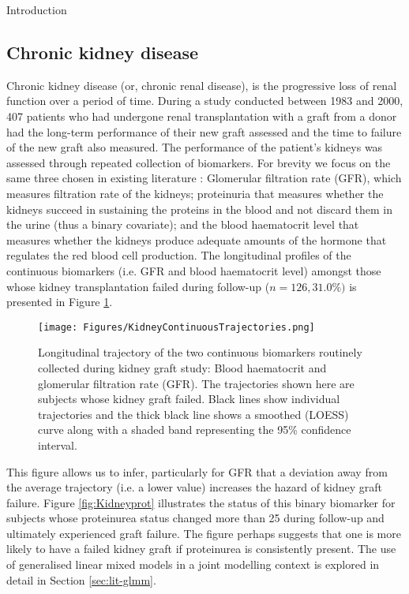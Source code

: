 \begin{chapter}{\label{cha:intro}Introduction}
  \subsection{\label{sec:motivation-kidney}Chronic kidney disease}
  Chronic kidney disease (or, chronic renal disease), is the progressive loss of renal function over a period of time. During a study conducted between 1983 and 2000, 407 patients who had undergone renal transplantation with a graft from a donor had the long-term performance of their new graft assessed and the time to failure of the new graft also measured. The performance of the patient's kidneys was assessed through repeated collection of biomarkers. For brevity we focus on the same three chosen in existing literature \citep{Rizopoulos2011B}: Glomerular filtration rate (GFR), which measures filtration rate of the kidneys; proteinuria  that measures whether the kidneys succeed in sustaining the proteins in the blood and not discard them in the urine (thus a binary covariate); and the blood haematocrit level that measures whether the kidneys produce adequate amounts of the hormone that regulates the red blood cell production. The longitudinal profiles of the continuous biomarkers (i.e. GFR and blood haematocrit level) amongst those whose kidney transplantation failed during follow-up ($n=126, 31.0\%)$ is presented in Figure \ref{fig:Kidneytrajectories}. 
  
  \begin{figure}[h]
      \centering
      \texttt{[image: Figures/KidneyContinuousTrajectories.png]}
      \caption{Longitudinal trajectory of the two continuous biomarkers routinely collected during kidney graft study: Blood haematocrit and glomerular filtration rate (GFR). The trajectories shown here are subjects whose kidney graft failed. Black lines show individual trajectories and the thick black line shows a smoothed (LOESS) curve along with a shaded band representing the 95\% confidence interval.}
      \label{fig:Kidneytrajectories}
  \end{figure}
  
  This figure allows us to infer, particularly for GFR that a deviation away from the average trajectory (i.e. a lower value) increases the hazard of kidney graft failure. Figure \ref{fig:Kidneyprot} illustrates the status of this binary biomarker for subjects whose proteinurea status changed more than 25 during follow-up and ultimately experienced graft failure. The figure perhaps suggests that one is more likely to have a failed kidney graft if proteinurea is consistently present. The use of generalised linear mixed models in a joint modelling context is explored in detail in Section \ref{sec:lit-glmm}.
  

\end{chapter}
